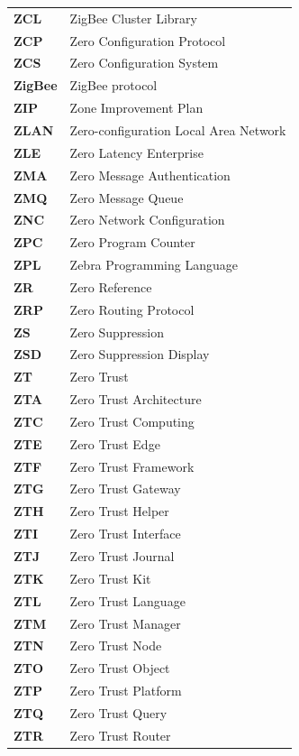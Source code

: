 \begin{longtable}{p{3cm}p{11cm}}
\textbf{ZCL} & ZigBee Cluster Library \\
\textbf{ZCP} & Zero Configuration Protocol \\
\textbf{ZCS} & Zero Configuration System \\
\textbf{ZigBee} & ZigBee protocol \\
\textbf{ZIP} & Zone Improvement Plan \\
\textbf{ZLAN} & Zero-configuration Local Area Network \\
\textbf{ZLE} & Zero Latency Enterprise \\
\textbf{ZMA} & Zero Message Authentication \\
\textbf{ZMQ} & Zero Message Queue \\
\textbf{ZNC} & Zero Network Configuration \\
\textbf{ZPC} & Zero Program Counter \\
\textbf{ZPL} & Zebra Programming Language \\
\textbf{ZR} & Zero Reference \\
\textbf{ZRP} & Zero Routing Protocol \\
\textbf{ZS} & Zero Suppression \\
\textbf{ZSD} & Zero Suppression Display \\
\textbf{ZT} & Zero Trust \\
\textbf{ZTA} & Zero Trust Architecture \\
\textbf{ZTC} & Zero Trust Computing \\
\textbf{ZTE} & Zero Trust Edge \\
\textbf{ZTF} & Zero Trust Framework \\
\textbf{ZTG} & Zero Trust Gateway \\
\textbf{ZTH} & Zero Trust Helper \\
\textbf{ZTI} & Zero Trust Interface \\
\textbf{ZTJ} & Zero Trust Journal \\
\textbf{ZTK} & Zero Trust Kit \\
\textbf{ZTL} & Zero Trust Language \\
\textbf{ZTM} & Zero Trust Manager \\
\textbf{ZTN} & Zero Trust Node \\
\textbf{ZTO} & Zero Trust Object \\
\textbf{ZTP} & Zero Trust Platform \\
\textbf{ZTQ} & Zero Trust Query \\
\textbf{ZTR} & Zero Trust Router \\

\end{longtable}
